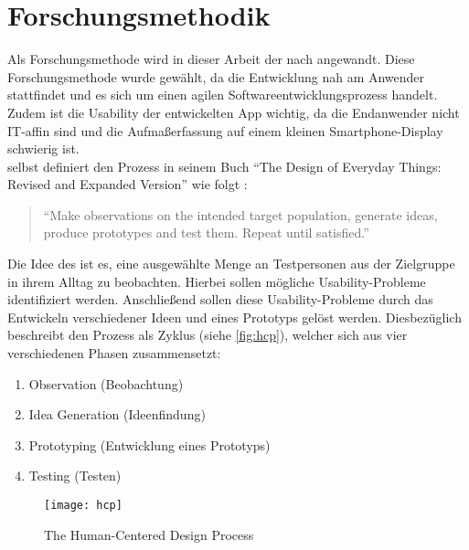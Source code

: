 \chapter{Forschungsmethodik}
Als Forschungsmethode wird in dieser Arbeit der \hcdp{} nach \citet{Norman13} angewandt.
Diese Forschungsmethode wurde gewählt, da die Entwicklung nah am Anwender stattfindet und es sich um einen agilen Softwareentwicklungsprozess handelt.
Zudem ist die Usability der entwickelten App wichtig, da die Endanwender nicht IT-affin sind und die Aufmaßerfassung auf einem kleinen Smartphone-Display schwierig ist. \\

\noindent
\citeauthor{Norman13} selbst definiert den Prozess in seinem Buch ``The Design of Everyday Things: Revised and Expanded Version'' wie folgt \citep[Abbildung 6.2]{Norman13}:

\begin{quote}
  ``Make observations on the intended target population, generate ideas, produce prototypes and test them.
  Repeat until satisfied.''
\end{quote}

\noindent
Die Idee des \hcdp{} ist es, eine ausgewählte Menge an Testpersonen aus der Zielgruppe in ihrem Alltag zu beobachten.
Hierbei sollen mögliche Usability-Probleme identifiziert werden.
Anschließend sollen diese Usability-Probleme durch das Entwickeln verschiedener Ideen und eines Prototyps gelöst werden.
Diesbezüglich beschreibt \citeauthor{Norman13} den Prozess als Zyklus (siehe \autoref{fig:hcp}), welcher sich aus vier verschiedenen Phasen zusammensetzt:

\begin{enumerate}
  \item Observation (Beobachtung) \label{itm:observation}
  \item Idea Generation (Ideenfindung) \label{itm:idea}
  \item Prototyping (Entwicklung eines Prototyps) \label{itm:prototyping}
  \item Testing (Testen) \label{itm:testing}
\end{enumerate}

\begin{figure}[h]
  \centering
  \texttt{[image: hcp]}
  \caption{The Human-Centered Design Process}
  \label{fig:hcp}
\end{figure}

